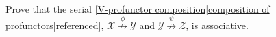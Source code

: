 
Prove that the serial \ref{V-profunctor composition|composition of profunctors|referenced}, $\mathcal{X}\overset{\phi}\nrightarrow\mathcal{Y}$ and $\mathcal{Y}\overset{\psi}\nrightarrow\mathcal{Z}$, is associative.